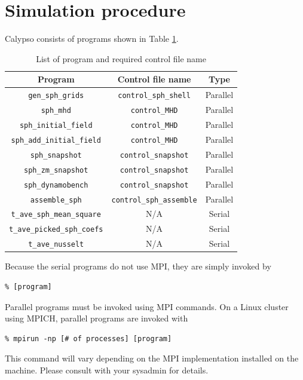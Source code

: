 \section{Simulation procedure}
Calypso consists of programs shown in Table \ref{table:controls}.
%
\begin{table}[htp]
\caption{List of program and required control file name}
\begin{center}
\begin{tabular}{|c|c|c|}
\hline
Program & Control file name & Type \\ \hline
\verb|gen_sph_grids|          & \verb|control_sph_shell| &  Parallel    \\
\verb|sph_mhd|                & \verb|control_MHD| &        Parallel  \\ \hline
\verb|sph_initial_field|      & \verb|control_MHD| &        Parallel  \\
\verb|sph_add_initial_field|  & \verb|control_MHD| &        Parallel  \\
\verb|sph_snapshot|           & \verb|control_snapshot| &   Parallel  \\ \hline
\verb|sph_zm_snapshot|        & \verb|control_snapshot| &   Parallel  \\
\verb|sph_dynamobench|        & \verb|control_snapshot| &   Parallel  \\ \hline
\verb|assemble_sph|           & \verb|control_sph_assemble| & Parallel  \\ \hline
\verb|t_ave_sph_mean_square|  & N/A & Serial  \\ \hline
\verb|t_ave_picked_sph_coefs| & N/A & Serial  \\ \hline
\verb|t_ave_nusselt|          & N/A & Serial  \\ \hline
\end{tabular}
\end{center}
\label{table:controls}
\end{table}
%
Because the serial programs do not use MPI, they are simply invoked by
%
\begin{verbatim}
% [program]
\end{verbatim}
%
Parallel programs must be invoked using MPI commands. On a Linux cluster using MPICH, parallel programs are invoked with 
%
\begin{verbatim}
% mpirun -np [# of processes] [program]
\end{verbatim}
%

This command will vary depending on the MPI implementation installed on the machine.  Please consult with your sysadmin for details.

